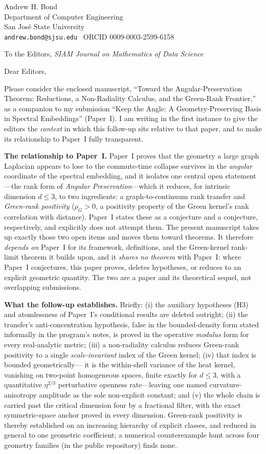 \documentclass[11pt]{article}
\begin{document}
\hfill Andrew H. Bond\\
\hfill Department of Computer Engineering\\
\hfill San Jos\'e State University\\
\hfill \texttt{andrew.bond@sjsu.edu} \textbullet\ ORCID 0009-0003-2599-6158

\bigskip
To the Editors, \emph{SIAM Journal on Mathematics of Data Science}

\bigskip
Dear Editors,

Please consider the enclosed manuscript, ``Toward the Angular-Preservation Theorem:
Reductions, a Non-Radiality Calculus, and the Green-Rank Frontier,'' as a companion to my
submission ``Keep the Angle: A Geometry-Preserving Basis in Spectral Embeddings'' (Paper~I).
I am writing in the first instance to give the editors the \emph{context} in which this
follow-up sits relative to that paper, and to make its relationship to Paper~I fully
transparent.

\textbf{The relationship to Paper~I.} Paper~I proves that the geometry a large graph
Laplacian appears to lose to the commute-time collapse survives in the \emph{angular}
coordinate of the spectral embedding, and it isolates one central open statement---the rank
form of \emph{Angular Preservation}---which it reduces, for intrinsic dimension $d\le3$, to
two ingredients: a graph-to-continuum rank transfer and \emph{Green-rank positivity}
($\rho_G>0$, a positivity property of the Green kernel's rank correlation with distance).
Paper~I states these as a conjecture and a conjecture, respectively, and explicitly does not
attempt them. The present manuscript takes up exactly those two open items and moves them
toward theorems. It therefore \emph{depends on} Paper~I for its framework, definitions, and
the Green-kernel rank-limit theorem it builds upon, and it \emph{shares no theorem} with
Paper~I: where Paper~I conjectures, this paper proves, deletes hypotheses, or reduces to an
explicit geometric quantity. The two are a paper and its theoretical sequel, not overlapping
submissions.

\textbf{What the follow-up establishes.} Briefly: (i) the auxiliary hypotheses (H3) and
atomlessness of Paper~I's conditional results are deleted outright; (ii) the transfer's
anti-concentration hypothesis, false in the bounded-density form stated informally in the
program's notes, is proved in the operative \emph{modulus} form for every real-analytic
metric; (iii) a non-radiality calculus reduces Green-rank positivity to a single
\emph{scale-invariant} index of the Green kernel; (iv) that index is bounded geometrically---
it is the within-shell variance of the heat kernel, vanishing on two-point homogeneous
spaces, finite exactly for $d\le3$, with a quantitative $\eta^{2/3}$ perturbative openness
rate---leaving one named curvature-anisotropy amplitude as the sole non-explicit constant;
and (v) the whole chain is carried past the critical dimension four by a fractional filter,
with the exact symmetric-space anchor proved in every dimension. Green-rank positivity is
thereby established on an increasing hierarchy of explicit classes, and reduced in general to
one geometric coefficient; a numerical counterexample hunt across four geometry families (in
the public repository) finds none.
\end{document}
